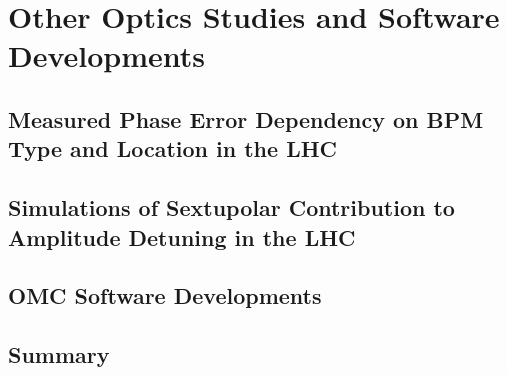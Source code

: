 \chapter{Other Optics Studies and Software Developments}
\label{chapter:Others_and_Software}


\section{Measured Phase Error Dependency on BPM Type and Location in the LHC}

\section{Simulations of Sextupolar Contribution to Amplitude Detuning in the LHC}

\cite{PRAB:White:Direct_Amplitude_Detuning_AC_Dipole}

\section{OMC Software Developments}

\section{Summary}
